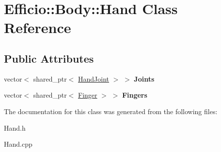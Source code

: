 \hypertarget{class_efficio_1_1_body_1_1_hand}{}\section{Efficio\+:\+:Body\+:\+:Hand Class Reference}
\label{class_efficio_1_1_body_1_1_hand}
\subsection*{Public Attributes}
\begin{DoxyCompactItemize}
\item 
vector$<$ shared\+\_\+ptr$<$ \hyperlink{class_efficio_1_1_hand_joint}{Hand\+Joint} $>$ $>$ {\bfseries Joints}\hypertarget{class_efficio_1_1_body_1_1_hand_a29a02b74c9b698a631db5131c9638c84}{}\label{class_efficio_1_1_body_1_1_hand_a29a02b74c9b698a631db5131c9638c84}

\item 
vector$<$ shared\+\_\+ptr$<$ \hyperlink{class_efficio_1_1_body_1_1_finger}{Finger} $>$ $>$ {\bfseries Fingers}\hypertarget{class_efficio_1_1_body_1_1_hand_a387040fdfdd749e6f24f9d290a79c1ee}{}\label{class_efficio_1_1_body_1_1_hand_a387040fdfdd749e6f24f9d290a79c1ee}

\end{DoxyCompactItemize}


The documentation for this class was generated from the following files\+:\begin{DoxyCompactItemize}
\item 
Hand.\+h\item 
Hand.\+cpp\end{DoxyCompactItemize}
